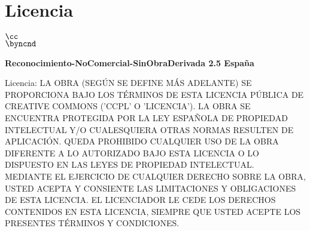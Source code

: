 \chapter{Licencia}

\begin{center}
  \begin{Huge}
    $\cc$\\
    $\byncnd$\\
  \end{Huge}

  \textbf{Reconocimiento-NoComercial-SinObraDerivada 2.5 Espa\~na}\\

\end{center}

Licencia: LA OBRA (SEG\'UN SE DEFINE M\'AS ADELANTE) SE PROPORCIONA BAJO LOS T\'ERMINOS DE ESTA LICENCIA P\'UBLICA DE CREATIVE COMMONS ('CCPL' O 'LICENCIA').  LA OBRA SE ENCUENTRA PROTEGIDA POR LA LEY ESPA\~NOLA DE PROPIEDAD INTELECTUAL Y/O CUALESQUIERA OTRAS NORMAS RESULTEN DE APLICACI\'ON.  QUEDA PROHIBIDO CUALQUIER USO DE LA OBRA DIFERENTE A LO AUTORIZADO BAJO ESTA LICENCIA O LO DISPUESTO EN LAS LEYES DE PROPIEDAD INTELECTUAL.\\

MEDIANTE EL EJERCICIO DE CUALQUIER DERECHO SOBRE LA OBRA, USTED ACEPTA Y CONSIENTE LAS LIMITACIONES Y OBLIGACIONES DE ESTA LICENCIA. EL LICENCIADOR LE CEDE LOS DERECHOS CONTENIDOS EN ESTA LICENCIA, SIEMPRE QUE USTED ACEPTE LOS PRESENTES T\'ERMINOS Y CONDICIONES.\\



